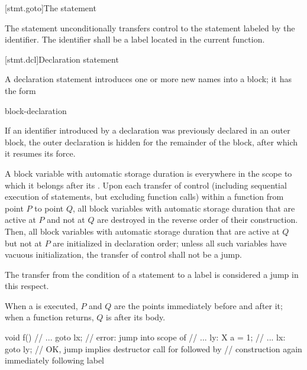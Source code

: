 [stmt.goto]{The  statement}%

\pnum
The  statement unconditionally transfers control to the
statement labeled by the identifier. The identifier shall be a
%
label located in the current function.

[stmt.dcl]{Declaration statement}%

\pnum
A declaration statement introduces one or more new names into a
block; it has the form
\begin{bnf}
\br
    block-declaration
\end{bnf}
\begin{note}
If an identifier introduced by a declaration was previously declared in
an outer block,
%
%
%
the outer declaration is hidden
for the remainder of the block,
after which it resumes its force.
\end{note}

\pnum
{}%
%
%
A block variable with automatic storage duration
is  everywhere in the scope to which it belongs
after its .
%
%
Upon each transfer of control (including sequential execution of statements,
but excluding function calls)
within a function from point $P$ to point $Q$,
all block variables with automatic storage duration
that are active at $P$ and not at $Q$ are destroyed in the reverse order of their construction.
Then, all block variables with automatic storage duration
that are active at $Q$ but not at $P$ are initialized in declaration order;
unless all such variables have vacuous initialization,
the transfer of control shall not be a jump.
\begin{footnote}
The transfer from the condition of a  statement to a
 label is considered a jump in this respect.
\end{footnote}
When a  is executed,
$P$ and $Q$ are the points immediately before and after it;
when a function returns, $Q$ is after its body.
\begin{example}
\begin{codeblock}
void f() {
  // ...
  goto lx;          // error: jump into scope of 
  // ...
ly:
  X a = 1;
  // ...
lx:
  goto ly;          // OK, jump implies destructor call for  followed by
                    // construction again immediately following label 
}
\end{codeblock}
\end{example}

